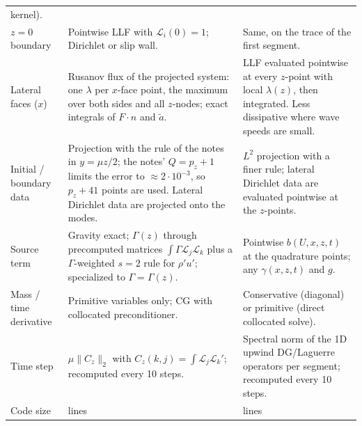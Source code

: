 \documentclass[11pt,a4paper]{article}
\newcommand{\Lag}{\mathscr{L}}
\begin{document}
\begin{center}
\begin{tabularx}{\textwidth}{@{}>{\raggedright\arraybackslash}p{2.6cm}>{\raggedright\arraybackslash}X>{\raggedright\arraybackslash}X@{}}
  kernel).\\
$z=0$ boundary & Pointwise LLF with $\Lag_i(0)=1$; Dirichlet or slip wall. &
  Same, on the trace of the first segment.\\
Lateral faces ($x$) & Rusanov flux of the projected system: one $\lambda$ per
  $x$-face point, the maximum over both sides and all $z$-nodes; exact integrals of
  $F\cdot n$ and $\tilde a$. &
  LLF evaluated pointwise at every $z$-point with local $\lambda(z)$, then
  integrated. Less dissipative where wave speeds are small.\\
Initial / boundary data & Projection with the rule of the notes in $y=\mu z/2$; the
  notes' $Q=p_z+1$ limits the error to $\approx2\cdot10^{-3}$, so $p_z+41$ points are
  used. Lateral Dirichlet data are projected onto the modes. &
  $L^2$ projection with a finer rule; lateral Dirichlet data are evaluated
  pointwise at the $z$-points.\\
Source term & Gravity exact; $\Gamma(z)$ through precomputed matrices
  $\int\Gamma\Lag_j\Lag_k$ plus a $\Gamma$-weighted $s=2$ rule for
  $\rho'u'$; specialized to $\Gamma=\Gamma(z)$. &
  Pointwise $b(U,x,z,t)$ at the quadrature points; any $\gamma(x,z,t)$ and $g$.\\
Mass / time derivative & Primitive variables only; CG with collocated preconditioner. &
  Conservative (diagonal) or primitive (direct collocated solve).\\
Time step & $\mu\|C_z\|_2$ with $C_z(k,j)=\int\Lag_j\Lag_k'$; recomputed every 10 steps. &
  Spectral norm of the 1D upwind DG/Laguerre operators per segment; recomputed every
  10 steps.\\
Code size & 2804 lines & 1895 lines\\
\bottomrule
\end{tabularx}
\end{center}
\end{document}
